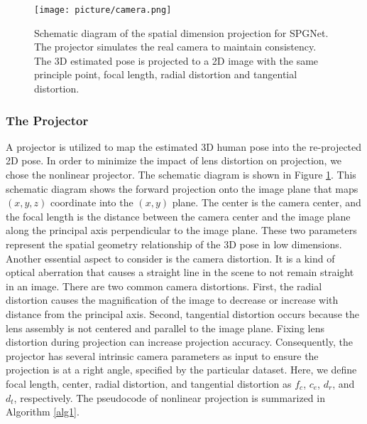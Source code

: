 \documentclass[runningheads]{llncs}
\begin{document}
\begin{figure}[!ht]
\texttt{[image: picture/camera.png]}
\caption{Schematic diagram of the spatial dimension projection for SPGNet. The projector simulates the real camera to maintain consistency. The 3D estimated pose is projected to a 2D image with the same principle point, focal length, radial distortion and tangential distortion.} \label{projection}
\end{figure}


\subsubsection{The Projector} A projector is utilized to map the estimated 3D human pose into the re-projected 2D pose. In order to minimize the impact of lens distortion on projection, we chose the nonlinear projector. The schematic diagram is shown in Figure \ref{projection}. This schematic diagram shows the forward projection onto the image plane that maps \((x,y,z)\) coordinate into the \((x,y)\) plane. The center is the camera center, and the focal length is the distance between the camera center and the image plane along the principal axis perpendicular to the image plane. These two parameters represent the spatial geometry relationship of the 3D pose in low dimensions. Another essential aspect to consider is the camera distortion. It is a kind of optical aberration that causes a straight line in the scene to not remain straight in an image. There are two common camera distortions. First, the radial distortion causes the magnification of the image to decrease or increase with distance from the principal axis. Second, tangential distortion occurs because the lens assembly is not centered and parallel to the image plane. Fixing lens distortion during projection can increase projection accuracy. Consequently, the projector has several intrinsic camera parameters as input to ensure the projection is at a right angle, specified by the particular dataset. Here, we define focal length, center, radial distortion, and tangential distortion as \(f_c\), \(c_e\), \(d_r\), and \(d_t\), respectively. The pseudocode of nonlinear projection is summarized in Algorithm \ref{alg1}. 
\end{document}
